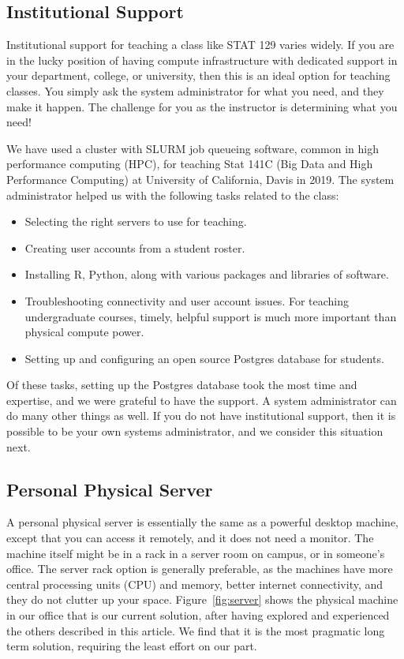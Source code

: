 \documentclass[12pt]{article}
\begin{document}

\subsection{Institutional Support}

Institutional support for teaching a class like STAT 129 varies widely.
If you are in the lucky position of having compute infrastructure with dedicated support in your department, college, or university, then this is an ideal option for teaching classes.
You simply ask the system administrator for what you need, and they make it happen.
The challenge for you as the instructor is determining what you need!

We have used a cluster with SLURM \cite{yoo2003slurm} job queueing software, common in high performance computing (HPC), for teaching Stat 141C (Big Data and High Performance Computing) at University of California, Davis in 2019.
The system administrator helped us with the following tasks related to the class:
\begin{itemize}
\item Selecting the right servers to use for teaching.
\item Creating user accounts from a student roster.
\item Installing R, Python, along with various packages and libraries of software.
\item Troubleshooting connectivity and user account issues.
    For teaching undergraduate courses, timely, helpful support is much more important than physical compute power.
\item Setting up and configuring an open source Postgres database for students.
\end{itemize}
Of these tasks, setting up the Postgres database took the most time and expertise, and we were grateful to have the support.
A system administrator can do many other things as well.
If you do not have institutional support, then it is possible to be your own systems administrator, and we consider this situation next.


\subsection{Personal Physical Server}

A personal physical server is essentially the same as a powerful desktop machine, except that you can access it remotely, and it does not need a monitor.
The machine itself might be in a rack in a server room on campus, or in someone's office.
The server rack option is generally preferable, as the machines have more central processing units (CPU) and memory, better internet connectivity, and they do not clutter up your space.
Figure~\ref{fig:server} shows the physical machine in our office that is our current solution, after having explored and experienced the others described in this article.
We find that it is the most pragmatic long term solution, requiring the least effort on our part.
\end{document}
